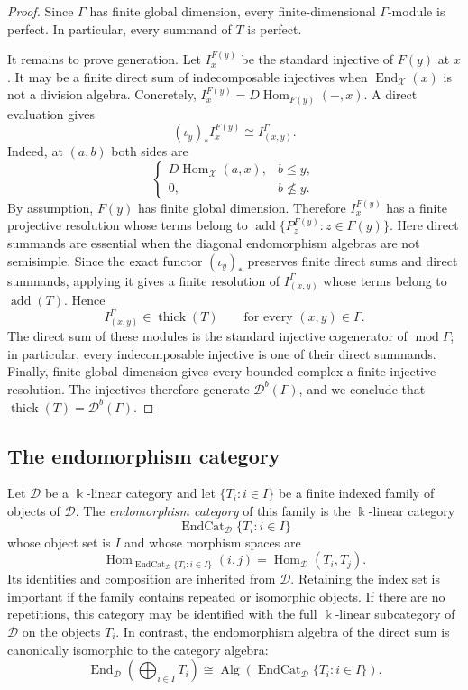 \documentclass[12pt,a4paper,english,reqno]{amsart}
\theoremstyle{plain}
\theoremstyle{definition}
\newcommand{\kk}{\Bbbk}
\newcommand{\Hom}{\operatorname{Hom}}
\newcommand{\End}{\operatorname{End}}
\newcommand{\thick}{\operatorname{thick}}
\newcommand{\add}{\operatorname{add}}
\newcommand{\X}{\mathcal X}
\newcommand{\G}{\Gamma}
\newcommand{\modu}{\operatorname{mod}}
\newcommand{\Db}[1]{{\mathscr D}^b(#1)}
\begin{document}
\begin{proof}
Since $\G$ has finite global dimension, every finite-dimensional
$\G$-module is perfect.  In particular, every summand of $T$ is perfect.

It remains to prove generation.  Let $I_x^{F(y)}$ be the standard injective
of $F(y)$ at $x$.  It may be a finite direct sum of indecomposable
injectives when $\End_{\X}(x)$ is not a division algebra.  Concretely, $I_x^{F(y)}=D\Hom_{F(y)}(-,x)$.
A direct evaluation gives
\begin{equation}
 (\iota_y)_*I_x^{F(y)}
 \cong I_{(x,y)}^{\G}.
\label{eq:injective-kan}
\end{equation}
Indeed, at $(a,b)$ both sides are
\[
 \begin{cases}
 D\Hom_{\X}(a,x),&b\leq y,\\
 0,&b\nleq y.
 \end{cases}
\]
By assumption, $F(y)$ has finite global dimension.  Therefore
$I_x^{F(y)}$ has a finite projective resolution whose terms belong to $\add\{P_z^{F(y)}:z\in F(y)\}$.
Here direct summands are essential when the diagonal endomorphism algebras
are not semisimple.  Since the exact functor $(\iota_y)_*$ preserves finite
direct sums and direct summands, applying it gives a finite resolution of
$I_{(x,y)}^{\G}$ whose terms belong to $\add(T)$.
Hence
\[
 I_{(x,y)}^{\G}\in\thick(T)
 \qquad\text{for every }(x,y)\in\G.
\]
The direct sum of these modules is the standard injective cogenerator of
$\modu\G$; in particular, every indecomposable injective is one of their
direct summands.  Finally, finite global dimension gives every bounded
complex a finite injective resolution.  The injectives therefore generate
$\Db{\G}$, and we conclude that
$\thick(T)=\Db{\G}$.
\end{proof}

\subsection{The endomorphism category}

Let $\mathcal D$ be a $\kk$-linear category and let
$\{T_i:i\in I\}$ be a finite indexed family of objects of $\mathcal D$.
The \emph{endomorphism category} of this family is the $\kk$-linear
category
\[
 \operatorname{EndCat}_{\mathcal D}\{T_i:i\in I\}
\]
whose object set is $I$ and whose morphism spaces are
\[
 \Hom_{\operatorname{EndCat}_{\mathcal D}\{T_i:i\in I\}}(i,j)
 =
 \Hom_{\mathcal D}(T_i,T_j).
\]
Its identities and composition are inherited from $\mathcal D$. Retaining the
index set is important if the family contains repeated or isomorphic objects.
If there are no repetitions, this category may be identified with the full
$\kk$-linear subcategory of $\mathcal D$ on the objects $T_i$. In
contrast, the endomorphism algebra of the direct sum is canonically
isomorphic to the category algebra:
\begin{equation}
 \End_{\mathcal D}\!\left(\bigoplus_{i\in I}T_i\right)
 \cong
 \operatorname{Alg}\!\left(
  \operatorname{EndCat}_{\mathcal D}\{T_i:i\in I\}
 \right).
\label{eq:endcat-algebra}
\end{equation}
\end{document}
